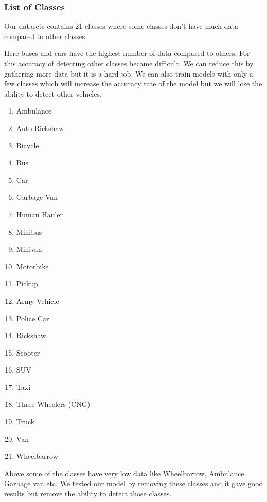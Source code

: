 \subsubsection{List of Classes}
Our datasets contains 21 classes where some classes don't have much data compared to other classes. 

Here buses and cars have the highest number of data compared to others. For this accuracy of detecting other classes became difficult. We can reduce this by gathering more data but it is a hard job. We can also train models with only a few classes which will increase the accuracy rate of the model but we will lose the ability to detect other vehicles.


\begin{multicols}{2}
\begin{enumerate}
\item Ambulance
\item Auto Rickshaw
\item Bicycle
\item Bus
\item Car
\item Garbage Van
\item Human Hauler
\item Minibus
\item Minivan
\item Motorbike
\item Pickup
\item Army Vehicle
\item Police Car
\item Rickshaw
\item Scooter
\item SUV
\item Taxi
\item Three Wheelers (CNG)
\item Truck
\item Van
\item Wheelbarrow
\end{enumerate}
\end{multicols}

Above some of the classes have very low data like Wheelbarrow, Ambulance Garbage van etc. We tested our model by removing these classes and it gave good results but remove the ability to detect those classes.  
\newpage




